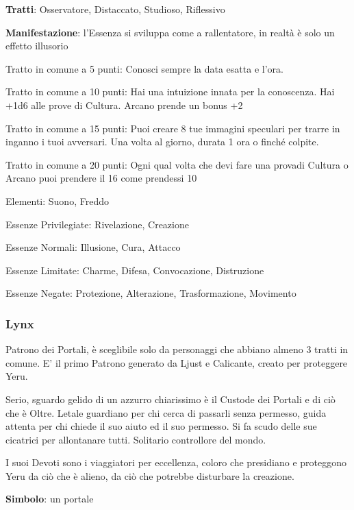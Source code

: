 \documentclass[a4paper,11pt,twoside,openany]{book}
\begin{document}
\textbf{Tratti}: Osservatore, Distaccato, Studioso, Riflessivo

\textbf{Manifestazione}: l'Essenza si sviluppa come a rallentatore, in realtà è solo un effetto illusorio

\bigskip

Tratto in comune a 5 punti: Conosci sempre la data esatta e l'ora.

Tratto in comune a 10 punti: Hai una intuizione innata per la conoscenza. Hai +1d6 alle prove di Cultura. Arcano prende un bonus +2

Tratto in comune a 15 punti: Puoi creare 8 tue immagini speculari per trarre in inganno i tuoi avversari. Una volta al giorno, durata 1 ora o finché colpite.

Tratto in comune a 20 punti: Ogni qual volta che devi fare una provadi Cultura o Arcano puoi prendere il 16 come prendessi 10

\bigskip

Elementi: Suono, Freddo

\bigskip

Essenze Privilegiate: Rivelazione, Creazione

Essenze Normali: Illusione, Cura, Attacco

Essenze Limitate: Charme, Difesa, Convocazione, Distruzione

Essenze Negate: Protezione, Alterazione, Trasformazione, Movimento

\subsubsection{Lynx}

\label{lynx}

Patrono dei Portali, è sceglibile solo da personaggi che abbiano almeno 3 tratti in comune. E' il primo Patrono generato da Ljust e Calicante, creato per proteggere Yeru.

Serio, sguardo gelido di un azzurro chiarissimo è il Custode dei Portali e di ciò che è Oltre. Letale guardiano per chi cerca di passarli senza permesso, guida attenta per chi chiede il suo aiuto ed il suo permesso. Si fa scudo delle sue cicatrici per allontanare tutti.
Solitario controllore del mondo.

I suoi Devoti sono i viaggiatori per eccellenza, coloro che presidiano e proteggono Yeru da ciò che è alieno, da ciò che potrebbe disturbare la creazione.

\textbf{Simbolo}: un portale
\end{document}
